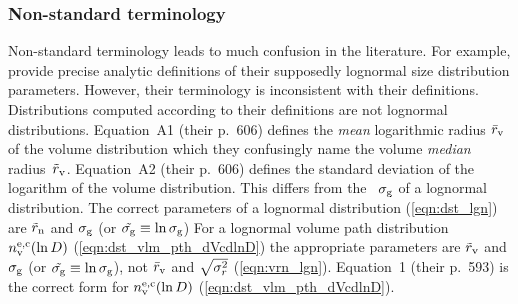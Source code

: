 \documentclass[12pt,twoside]{article}
\newcommand{\vrnrds}{\sdn_{\rds}^{2}} %
\begin{document}
\subsubsection[Non-standard terminology]{Non-standard terminology}\label{sxn:mst}\label{sxn:trm}
Non-standard terminology leads to much confusion in the literature.
For example, \cite{DHE02} provide precise analytic definitions
of their supposedly lognormal size distribution parameters.
However, their terminology is inconsistent with their definitions.
Distributions computed according to their definitions are not
lognormal distributions. 
\cite{DHE02} Equation~A1 (their p.~606) defines the \textit{mean}
logarithmic radius $\bar{r}_{\mathrm{v}}$ of the volume distribution which they
confusingly name the volume \textit{median} radius~$\tilde{r}_{\mathrm{v}}$.
\cite{DHE02} Equation~A2 (their p.~606) defines the standard deviation 
of the logarithm of the volume distribution.
This differs from the ~$\sigma_{\mathrm{g}}$
of a lognormal distribution.
The correct parameters of a lognormal distribution (\ref{eqn:dst_lgn})  
are $\tilde{r}_{\mathrm{n}}$ and $\sigma_{\mathrm{g}}$ (or $\tilde{\sigma_{\mathrm{g}}} \equiv \ln \sigma_{\mathrm{g}}$)
For a lognormal volume path distribution $n_{\mathrm{v}}^{\mathrm{e},\mathrm{c}}(\ln D)$
(\ref{eqn:dst_vlm_pth_dVcdlnD}) the appropriate parameters are 
$\tilde{r}_{\mathrm{v}}$ and $\sigma_{\mathrm{g}}$ (or $\tilde{\sigma_{\mathrm{g}}} \equiv \ln \sigma_{\mathrm{g}}$), not 
$\bar{r}_{\mathrm{v}}$ and $\sqrt{\vrnrds}$ (\ref{eqn:vrn_lgn}).
\cite{DHE02} Equation~1 (their p.~593) is the correct form for 
$n_{\mathrm{v}}^{\mathrm{e},\mathrm{c}}(\ln D)$ (\ref{eqn:dst_vlm_pth_dVcdlnD}).
\end{document}
